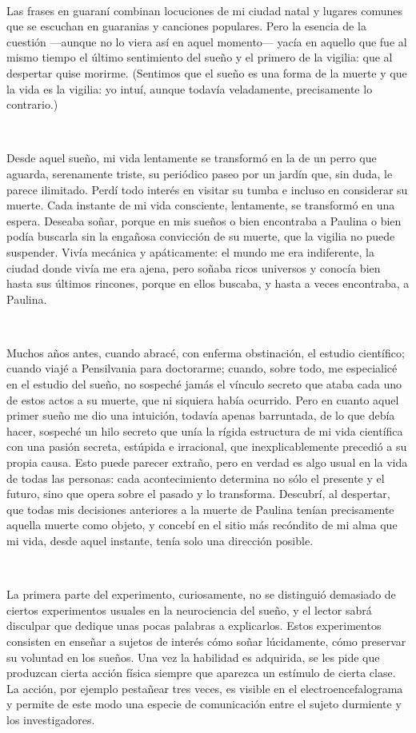 \documentclass[a4paper, 12pt]{article}
\begin{document}
~


Las frases en guaraní combinan locuciones de mi ciudad natal y lugares comunes
que se escuchan en guaranias y canciones populares. Pero la esencia de la
cuestión ---aunque no lo viera así en aquel momento--- yacía en aquello que fue
al mismo tiempo el último sentimiento del sueño y el primero de la vigilia: que
al despertar quise morirme. (Sentimos que el sueño es una forma de la muerte y
que la vida es la vigilia: yo intuí, aunque todavía veladamente, precisamente lo
contrario.) 

~

Desde aquel sueño, mi vida lentamente se transformó en la de un perro que
aguarda, serenamente triste, su periódico paseo por un jardín que, sin duda, le
parece ilimitado. Perdí todo interés en visitar su tumba e incluso en considerar
su muerte. Cada instante de mi vida consciente, lentamente, se transformó en una
espera. Deseaba soñar, porque en mis sueños o bien encontraba a Paulina o bien
podía buscarla sin la engañosa convicción de su muerte, que la vigilia no puede
suspender. Vivía mecánica y apáticamente: el mundo me era indiferente, la ciudad
donde vivía me era ajena, pero soñaba ricos universos y conocía bien hasta
sus últimos rincones, porque en ellos buscaba, y hasta a veces encontraba, a
Paulina. 

~

Muchos años antes, cuando abracé, con enferma obstinación, el estudio
científico; cuando viajé a Pensilvania para doctorarme; cuando, sobre todo, me
especialicé en el estudio del sueño, no sospeché jamás el vínculo secreto que
ataba cada uno de estos actos a su muerte, que ni siquiera había ocurrido. Pero
en cuanto aquel primer sueño me dio una intuición, todavía apenas barruntada, de
lo que debía hacer, sospeché un hilo secreto que unía la rígida estructura de mi
vida científica con una pasión secreta, estúpida e irracional, que
inexplicablemente precedió a su propia causa. Esto puede parecer extraño, pero
en verdad es algo usual en la vida de todas las personas: cada acontecimiento
determina no sólo el presente y el futuro, sino que opera sobre
el pasado y lo transforma. Descubrí, al despertar, que todas mis decisiones
anteriores a la muerte de Paulina tenían precisamente aquella muerte como
objeto, y concebí en el sitio más recóndito de mi alma que mi vida, desde aquel
instante, tenía solo una dirección posible.

~

La primera parte del experimento, curiosamente, no se distinguió demasiado de
ciertos experimentos usuales en la neurociencia del sueño, y el lector sabrá
disculpar que dedique unas pocas palabras a explicarlos. Estos experimentos
consisten en enseñar a sujetos de interés cómo soñar lúcidamente, cómo preservar
su voluntad en los sueños. Una vez la habilidad es adquirida, se les pide que
produzcan cierta acción física siempre que aparezca un estímulo de cierta clase.
La acción, por ejemplo pestañear tres veces, es visible en el
electroencefalograma y permite de este modo una especie de comunicación entre el
sujeto durmiente y los investigadores. 
\end{document}

